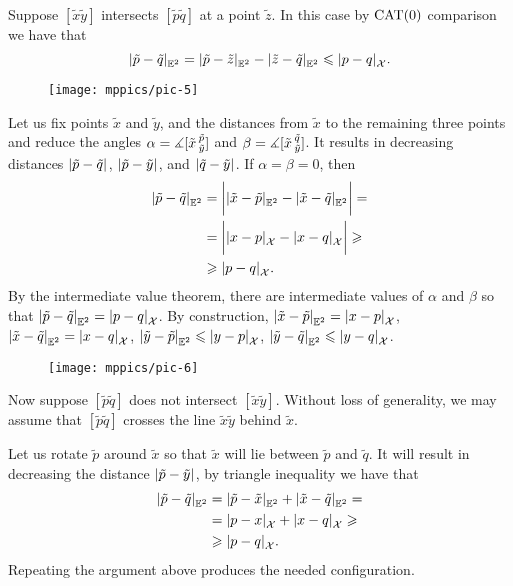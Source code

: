 Suppose $[\tilde x \tilde y]$ intersects $[\tilde p\tilde q]$ at a point $\tilde z$.
In this case by $\mathrm{CAT}(0)$ comparison we have that
\[\dist{\tilde p}{\tilde q}{\EE^2}=\dist{\tilde p}{\tilde z}{\EE^2}-\dist{\tilde z}{\tilde q}{\EE^2}\le \dist{p}{q}{\spc{X}}.\]

\begin{wrapfigure}[8]{o}{30 mm}
\vskip-2mm
\centering
\texttt{[image: mppics/pic-5]}
\end{wrapfigure}

Let us fix points $\tilde x$ and $\tilde y$, and the distances from $\tilde x$ to the remaining three points and reduce the angles $\alpha=\measuredangle[\tilde x\,{}^{\tilde p}_{\tilde y}]$ and $\beta=\measuredangle[\tilde x\,{}^{\tilde q}_{\tilde y}]$.
It results in decreasing distances $\dist{\tilde p}{\tilde q}{}$, $\dist{\tilde p}{\tilde y}{}$, and $\dist{\tilde q}{\tilde y}{}$.
If $\alpha=\beta=0$, then 
\begin{align*}
\dist{\tilde p}{\tilde q}{\EE^2}&=
\biggl|\dist{\tilde x}{\tilde p}{\EE^2}-\dist{\tilde x}{\tilde q}{\EE^2}\biggr|=
\\
&=\biggl|\dist{ x}{ p}{\spc{X}}-\dist{ x}{ q}{\spc{X}}\biggr|\ge
\\
&\ge\dist{p}{q}{\spc{X}}.
\end{align*}
By the intermediate value theorem, there are intermediate values of $\alpha$ and $\beta$ so that $\dist{\tilde p}{\tilde q}{\EE^2}\z=\dist{p}{q}{\spc{X}}$.
By construction, $\dist{\tilde x}{\tilde p}{\EE^2}=\dist{x}{p}{\spc{X}}$, $\dist{\tilde x}{\tilde q}{\EE^2}=\dist{x}{q}{\spc{X}}$, $\dist{\tilde y}{\tilde p}{\EE^2}\le\dist{y}{p}{\spc{X}}$, $\dist{\tilde y}{\tilde q}{\EE^2}\le\dist{y}{q}{\spc{X}}$.

\begin{wrapfigure}{o}{30 mm}
\vskip-0mm
\centering
\texttt{[image: mppics/pic-6]}
\end{wrapfigure}

Now suppose $[\tilde p \tilde q]$ does not intersect $[\tilde x\tilde y]$.
Without loss of generality, we may assume that $[\tilde p \tilde q]$ crosses the line $\tilde x\tilde y$ behind $\tilde x$.

Let us rotate $\tilde p$ around $\tilde x$ so that $\tilde x$ will lie between $\tilde p$ and $\tilde q$.
It will result in decreasing the distance $\dist{\tilde p}{\tilde y}{}$,
by triangle inequality we have that 
\begin{align*}
\dist{\tilde p}{\tilde q}{\EE^2}&=\dist{\tilde p}{\tilde x}{\EE^2}+\dist{\tilde x}{\tilde q}{\EE^2}=
\\
&=\dist{p}{x}{\spc{X}}+\dist{x}{q}{\spc{X}}\ge
\\
&\ge \dist{p}{q}{\spc{X}}.
\end{align*}
Repeating the argument above produces the needed configuration.

